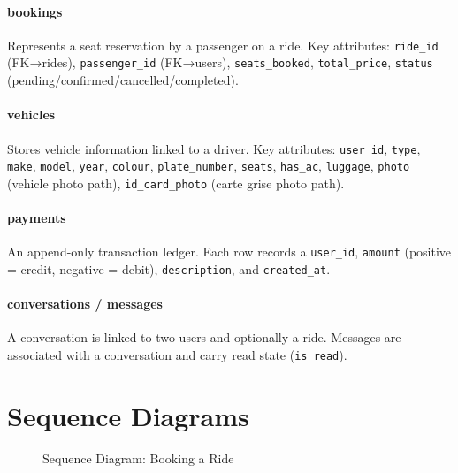 \documentclass[12pt,a4paper,openright]{report}
\begin{document}
\paragraph{bookings} Represents a seat reservation by a passenger on a ride. Key attributes: \texttt{ride\_id} (FK→rides), \texttt{passenger\_id} (FK→users), \texttt{seats\_booked}, \texttt{total\_price}, \texttt{status} (pending/confirmed/cancelled/completed).

\paragraph{vehicles} Stores vehicle information linked to a driver. Key attributes: \texttt{user\_id}, \texttt{type}, \texttt{make}, \texttt{model}, \texttt{year}, \texttt{colour}, \texttt{plate\_number}, \texttt{seats}, \texttt{has\_ac}, \texttt{luggage}, \texttt{photo} (vehicle photo path), \texttt{id\_card\_photo} (carte grise photo path).

\paragraph{payments} An append-only transaction ledger. Each row records a \texttt{user\_id}, \texttt{amount} (positive = credit, negative = debit), \texttt{description}, and \texttt{created\_at}.

\paragraph{conversations / messages} A conversation is linked to two users and optionally a ride. Messages are associated with a conversation and carry read state (\texttt{is\_read}).

\section{Sequence Diagrams}

\begin{figure}[H]
\centering
{}
\caption{Sequence Diagram: Booking a Ride}
\label{fig:seq-booking}
\end{figure}
\end{document}
